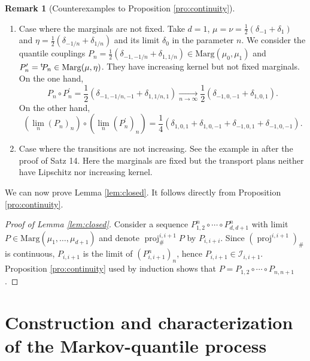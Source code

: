 \documentclass[11pt]{article}
\newcommand{\skpt}{\smallskip}
\theoremstyle{plain}
\theoremstyle{definition}
\newtheorem{rem}[them]{Remark}
\newcommand{\trans}{{}^{\mathrm{t}}\mkern-1mu}
\newcommand{\ma}{\mathrm{Marg}}
\newcommand{\pr}{\operatorname{proj}}
\begin{document}
\skpt
\begin{rem}[Counterexamples to Proposition \ref{pro:continuity}]
\begin{enumerate}
\item
Case where the mar\-gin\-als are not fixed. Take $d=1$, $\mu=\nu=\frac{1}{2}(\delta_{-1}+\delta_1)$ and $\eta=\frac{1}{2}(\delta_{-1/n}+\delta_{1/n})$ and its limit $\delta_0$ in the parameter $n$. We consider the quantile couplings $P_n=\frac{1}{2}(\delta_{-1,-1/n}+\delta_{1,1/n})\in\ma(\mu_0,\mu_1)$ and $P^{\prime}_n=\trans\!P_n\in\ma(\mu,\eta)$. They have increasing kernel but not fixed marginals. On the one hand,
\[
P_n\circ P^{\prime}_n=\frac{1}{2}(\delta_{-1,-1/n,-1}+\delta_{1,1/n,1})\underset{n\to\infty}{\longrightarrow}\frac{1}{2}(\delta_{-1,0,-1}+\delta_{1,0,1}).
\]
On the other hand,
\[
(\lim_n(P_n)_{n})\circ(\lim_n(P^{\prime}_n)_{n})=\frac{1}{4}(\delta_{1,0,1}+\delta_{1,0,-1}+\delta_{-1,0,1}+\delta_{-1,0,-1}).
\]

\item
Case where the transitions are not increasing. See the example in \cite{Ke72} after the proof of Satz 14. Here the marginals are fixed but the transport plans neither have Lipschitz nor increasing kernel.
\end{enumerate}
\end{rem}

We can now prove Lemma \ref{lem:closed}. It follows directly from Proposition \ref{pro:continuity}.

\begin{proof}[Proof of Lemma \ref{lem:closed}]\label{proof:lem:closed}
Consider a sequence $P^n_{1,2}\circ\cdots\circ P^n_{d,d+1}$ with limit $P\in\ma(\mu_1,\ldots,\mu_{d+1})$ and denote $\pr^{i,i+1}_{\#}P$ by $P_{i,i+i}$. Since $(\pr^{i,i+1})_\#$ is continuous, $P_{i,i+1}$ is the limit of $(P_{i,i+1}^n)_n$, hence $P_{i,i+1}\in\mathcal{I}_{i,i+1}$. Proposition \ref{pro:continuity} used by induction shows that $P=P_{1,2}\circ\cdots\circ P_{n,n+1}$.
\end{proof}

\section{Construction and characterization of the Markov-quantile process}\label{sec:construction}
\end{document}
